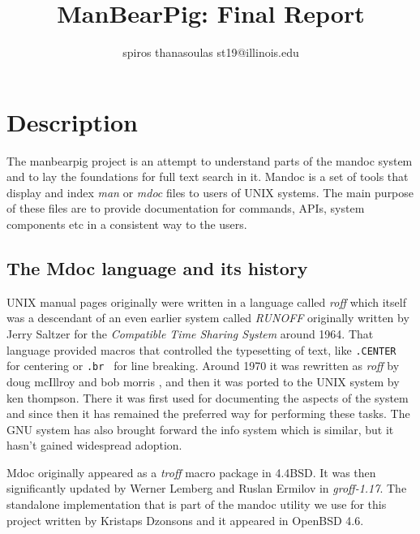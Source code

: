 \documentclass{report}
\begin{document}
\title{ManBearPig: Final Report}
\author{spiros thanasoulas st19@illinois.edu}
\maketitle

\section*{Description}
The manbearpig project is an attempt to understand parts of the mandoc system and to lay the foundations for full text search in it.
Mandoc is a set of tools that display and index {\it man} or {\it mdoc} files to users of UNIX systems. The main purpose of these files are to 
provide documentation for commands, APIs, system components etc in a consistent way to the users.


\subsection*{The Mdoc language and its history}
UNIX manual pages originally were written in a language called {\it roff} which itself was a descendant of an even earlier system called {\it RUNOFF}
originally written by Jerry Saltzer for the {\it Compatible Time Sharing System} around 1964. That language provided macros that controlled the typesetting 
of text, like {\tt .CENTER } for centering or {\tt .br } for line breaking. Around 1970 it was rewritten as {\it roff} by doug mcIllroy and bob morris , and then
it was ported to the UNIX system by ken thompson. There it was first used for documenting the aspects of the system and since then it has remained the preferred
way for performing these tasks. The GNU system has also brought forward the info system which is similar, but it hasn't gained widespread adoption.

Mdoc originally appeared as a {\it troff} macro package in 4.4BSD. It was then significantly updated by Werner Lemberg and Ruslan Ermilov in {\it groff-1.17}. 
The standalone implementation that is part of the mandoc utility we use for this project written by Kristaps Dzonsons and it appeared in OpenBSD 4.6.
\end{document}

